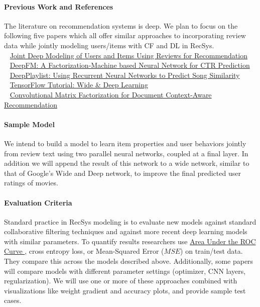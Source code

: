 \documentclass[preprint,10.5pt]{article}
\begin{document}
\paragraph{Previous Work and References} The literature on recommendation systems is deep. We plan to focus on the following five papers which all offer similar approaches to incorporating review data while jointly modeling users/items with CF and DL in RecSys.\\
\ \newline
\href{https://arxiv.org/pdf/1701.04783.pdf}{Joint Deep Modeling of Users and Items Using Reviews for Recommendation}\\
\ \newline
\href{https://arxiv.org/pdf/1703.04247.pdf}{DeepFM: A Factorization-Machine based Neural Network for CTR Prediction}\\
\ \newline
\href{https://cs224d.stanford.edu/reports/BalakrishnanDixit.pdf}{DeepPlaylist: Using Recurrent Neural Networks to
Predict Song Similarity}\\
\ \newline
\href{https://www.tensorflow.org/tutorials/wide_and_deep}{TensorFlow Tutorial: Wide \& Deep Learning}\\
\ \newline
\href{http://dm.postech.ac.kr/~cartopy/ConvMF/}{Convolutional Matrix Factorization for Document Context-Aware Recommendation}

\paragraph{Sample Model} We intend to build a model to learn item properties and user behaviors jointly from review text using two parallel neural networks, coupled at a final layer. In addition we will append the result of this network to a wide network, similar to that of Google's Wide and Deep network, to improve the final predicted user ratings of movies.

\paragraph{Evaluation Criteria} Standard practice in RecSys modeling is to evaluate new models against standard collaborative filtering techniques and against more recent deep learning models with similar parameters. To quantify results researchers use \href{https://en.wikipedia.org/wiki/Receiver_operating_characteristic}{Area Under the ROC Curve }, cross entropy loss, or Mean-Squared Error ($MSE$) on train/test data. They compare this across the models described above. Additionally, some papers will compare models with different parameter settings (optimizer, CNN layers, regularization). We will use one or more of these approaches combined with visualizations like weight gradient and accuracy plots, and provide sample test cases.  
\end{document}
